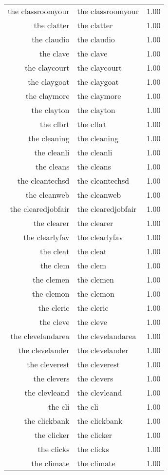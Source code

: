 \begin{table}[ht]
\begin{tabular}{rlr}
  the classroomyour & the classroomyour & 1.00 \\ 
  the clatter & the clatter & 1.00 \\ 
  the claudio & the claudio & 1.00 \\ 
  the clave & the clave & 1.00 \\ 
  the claycourt & the claycourt & 1.00 \\ 
  the claygoat & the claygoat & 1.00 \\ 
  the claymore & the claymore & 1.00 \\ 
  the clayton & the clayton & 1.00 \\ 
  the clbrt & the clbrt & 1.00 \\ 
  the cleaning & the cleaning & 1.00 \\ 
  the cleanli & the cleanli & 1.00 \\ 
  the cleans & the cleans & 1.00 \\ 
  the cleantechsd & the cleantechsd & 1.00 \\ 
  the cleanweb & the cleanweb & 1.00 \\ 
  the clearedjobfair & the clearedjobfair & 1.00 \\ 
  the clearer & the clearer & 1.00 \\ 
  the clearlyfav & the clearlyfav & 1.00 \\ 
  the cleat & the cleat & 1.00 \\ 
  the clem & the clem & 1.00 \\ 
  the clemen & the clemen & 1.00 \\ 
  the clemon & the clemon & 1.00 \\ 
  the cleric & the cleric & 1.00 \\ 
  the cleve & the cleve & 1.00 \\ 
  the clevelandarea & the clevelandarea & 1.00 \\ 
  the clevelander & the clevelander & 1.00 \\ 
  the cleverest & the cleverest & 1.00 \\ 
  the clevers & the clevers & 1.00 \\ 
  the clevleand & the clevleand & 1.00 \\ 
  the cli & the cli & 1.00 \\ 
  the clickbank & the clickbank & 1.00 \\ 
  the clicker & the clicker & 1.00 \\ 
  the clicks & the clicks & 1.00 \\ 
  the climate & the climate & 1.00 \\ 

\end{tabular}
\end{table}
